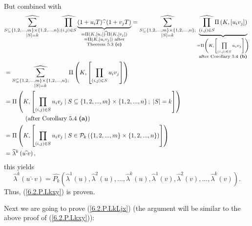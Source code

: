 \documentclass[numbers=enddot,12pt,final,onecolumn,notitlepage]{scrartcl}%
\begin{document}
But combined with%
\begin{align*}
&  \widehat{\sum_{\substack{S\subseteq\left\{  1,2,...,m\right\}
\times\left\{  1,2,...,n\right\}  ;\\\left\vert S\right\vert =k}%
}}\widehat{\prod_{\left(  i,j\right)  \in S}}\underbrace{\left(
1+u_{i}T\right)  \widehat{\cdot}\left(  1+v_{j}T\right)  }_{\substack{=\Pi
\left(  K,\left[  u_{i}\right]  \right)  \widehat{\cdot}\Pi\left(  K,\left[
v_{j}\right]  \right)  \\=\Pi\left(  K,\left[  u_{i}v_{j}\right]  \right)
\text{ after}\\\text{Theorem 5.3 \textbf{(c)}}}}=\widehat{\sum
_{\substack{S\subseteq\left\{  1,2,...,m\right\}  \times\left\{
1,2,...,n\right\}  ;\\\left\vert S\right\vert =k}}}\underbrace{\widehat{\prod
_{\left(  i,j\right)  \in S}}\Pi\left(  K,\left[  u_{i}v_{j}\right]  \right)
}_{\substack{=\Pi\left(  K,\left[  \prod\limits_{\left(  i,j\right)  \in
S}u_{i}v_{j}\right]  \right)  \\\text{after Corollary 5.4 \textbf{(b)}}}}\\
&  =\widehat{\sum_{\substack{S\subseteq\left\{  1,2,...,m\right\}
\times\left\{  1,2,...,n\right\}  ;\\\left\vert S\right\vert =k}}}\Pi\left(
K,\left[  \prod\limits_{\left(  i,j\right)  \in S}u_{i}v_{j}\right]  \right)
\\
&  =\Pi\left(  K,\left[  \prod_{\left(  i,j\right)  \in S}u_{i}v_{j}\mid
S\subseteq\left\{  1,2,...,m\right\}  \times\left\{  1,2,...,n\right\}
;\ \left\vert S\right\vert =k\right]  \right) \\
&  \ \ \ \ \ \ \ \ \ \ \left(  \text{after Corollary 5.4 \textbf{(a)}}\right)
\\
&  =\Pi\left(  K,\left[  \prod_{\left(  i,j\right)  \in S}u_{i}v_{j}\mid
S\in\mathcal{P}_{k}\left(  \left\{  1,2,...,m\right\}  \times\left\{
1,2,...,n\right\}  \right)  \right]  \right) \\
&  =\widehat{\lambda}^{k}\left(  u\widehat{\cdot}v\right)  ,
\end{align*}
this yields%
\[
\widehat{\lambda}^{k}\left(  u\widehat{\cdot}v\right)  =\widehat{P_{k}}\left(
\widehat{\lambda}^{1}\left(  u\right)  ,\widehat{\lambda}^{2}\left(  u\right)
,...,\widehat{\lambda}^{k}\left(  u\right)  ,\widehat{\lambda}^{1}\left(
v\right)  ,\widehat{\lambda}^{2}\left(  v\right)  ,...,\widehat{\lambda}%
^{k}\left(  v\right)  \right)  .
\]
Thus, (\ref{6.2.P.Lkxy}) is proven.

Next we are going to prove (\ref{6.2.P.LkLjx}) (the argument will be similar
to the above proof of (\ref{6.2.P.Lkxy})):
\end{document}
